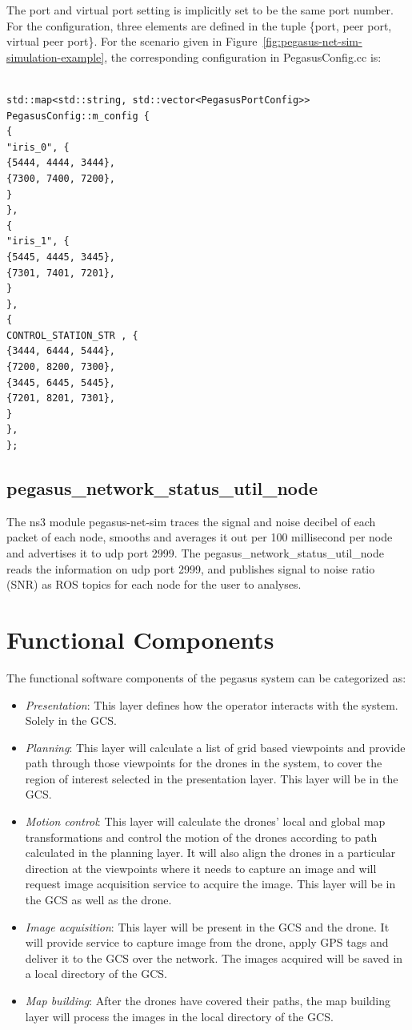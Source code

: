 The port and virtual port setting is implicitly set to be the same port number. For the configuration, three elements are defined in the tuple \{port, peer port, virtual peer port\}. For the scenario given in Figure~\ref{fig:pegasus-net-sim-simulation-example}, the corresponding configuration in PegasusConfig.cc is:

\begin{verbatim}

std::map<std::string, std::vector<PegasusPortConfig>> 
PegasusConfig::m_config {
{
"iris_0", {
{5444, 4444, 3444},
{7300, 7400, 7200},
}
},
{
"iris_1", {
{5445, 4445, 3445},
{7301, 7401, 7201},
}
},
{
CONTROL_STATION_STR , {
{3444, 6444, 5444},
{7200, 8200, 7300},
{3445, 6445, 5445},
{7201, 8201, 7301},
}
},
};
\end{verbatim}

\subsection{pegasus\_network\_status\_util\_node}

The ns3 module pegasus-net-sim traces the signal and noise decibel of each packet of each node, smooths and averages it out per 100 millisecond per node and advertises it to udp port 2999. The pegasus\_network\_status\_util\_node reads the information on udp port 2999, and publishes signal to noise ratio (SNR) as ROS topics for each node for the user to analyses. 

\section{Functional Components}
The functional software components of the pegasus system can be categorized as:
\begin{itemize}
	\item \textit{Presentation}: This layer defines how the operator interacts with the system. Solely in the GCS.
	\item \textit{Planning}: This layer will calculate a list of grid based viewpoints and provide path through those viewpoints for the drones in the system, to cover the region of interest selected in the presentation layer. This layer will be in the GCS. 
	\item \textit{Motion control}: This layer will calculate the drones' local and global map transformations and control the motion of the drones according to path calculated in the planning layer. It will also align the drones in a particular direction at the viewpoints where it needs to capture an image and will request image acquisition service to acquire the image. This layer will be in the GCS as well as the drone.
	\item \textit{Image acquisition}:  This layer will be present in the GCS and the drone. It will provide service to capture image from the drone, apply GPS tags and deliver it to the GCS over the network. The images acquired will be saved in a local directory of the GCS.
	\item \textit{Map building}: After the drones have covered their paths, the map building layer will process the images in the local directory of the GCS.
\end{itemize}

